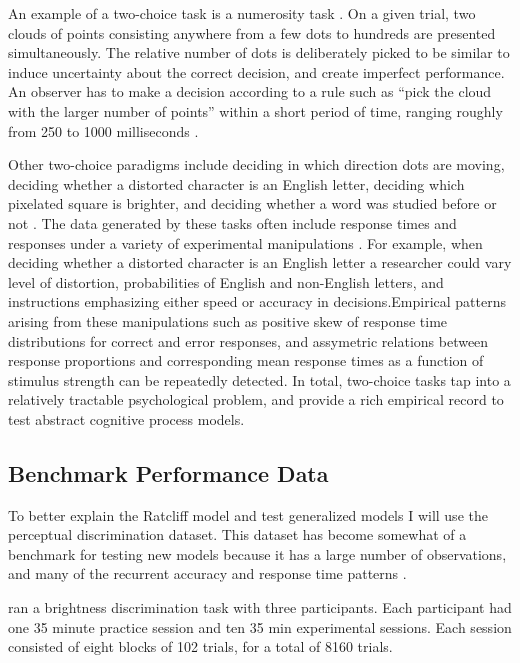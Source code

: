 \documentclass[12pt]{article}
\begin{document}
An example of a two-choice task is a numerosity task \citep{RatLov2012}. On
a given trial, two clouds of points consisting anywhere from a few dots to
hundreds are presented simultaneously. The relative number of dots is
deliberately picked to be similar to induce uncertainty about the correct
decision, and create imperfect performance. An observer has to make a
decision according to a rule such as ``pick the cloud with the larger
number of points'' within a short period of time, ranging roughly from 250
to 1000 milliseconds \citep{RatLov2012}.
    
Other two-choice paradigms include deciding in which direction dots are
moving, deciding whether a distorted character is an English letter,
deciding which pixelated square is brighter, and deciding whether a word
was studied before or not
\citep{SmiRat2004,RatSmi2004,RatRou1998,PerVan2002}. The data generated by
these tasks often include response times and responses under a variety of
experimental manipulations \citep{Luc1986}. For example, when
deciding whether a distorted character is an English letter a researcher
could vary level of distortion, probabilities of English and non-English
letters, and instructions emphasizing either speed or accuracy in
decisions.Empirical patterns arising from these manipulations such as positive skew of response time distributions for correct and error responses, and assymetric relations between response proportions
and corresponding mean response times as a function of stimulus strength can be
repeatedly detected. In total, two-choice tasks tap into a relatively tractable psychological problem, and provide a rich empirical record to test abstract cognitive process models.
    
\subsection{Benchmark Performance Data}
To better explain the Ratcliff model and test generalized models I will use the \citet{RatRou1998} perceptual discrimination dataset. This dataset has become somewhat of a benchmark for testing new models because it has a large number of observations, and many of the recurrent accuracy and response time patterns \citep{VanTue2008,VanTue2011}.

\citet{RatRou1998} ran a
brightness discrimination task with three participants. Each participant had one 35 minute practice session and ten 35 min experimental sessions. Each session consisted of eight blocks of 102 trials, for a total of 8160 trials. 
\end{document}
